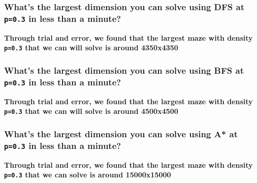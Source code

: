 \documentclass[11pt]{article}
\begin{document}
    \hypertarget{whats-the-largest-dimension-you-can-solve-using-dfs-at-p0.3-in-less-than-a-minute}{%
\subsubsection{\texorpdfstring{What's the largest dimension you can
solve using DFS at \texttt{p=0.3} in less than a
minute?}{What's the largest dimension you can solve using DFS at p=0.3 in less than a minute?}}\label{whats-the-largest-dimension-you-can-solve-using-dfs-at-p0.3-in-less-than-a-minute}}

    \textbf{Through trial and error, we found that the largest maze with
density \texttt{p=0.3} that we can will solve is around 4350x4350}

    \hypertarget{whats-the-largest-dimension-you-can-solve-using-bfs-at-p0.3-in-less-than-a-minute}{%
\subsubsection{\texorpdfstring{What's the largest dimension you can
solve using BFS at \texttt{p=0.3} in less than a
minute?}{What's the largest dimension you can solve using BFS at p=0.3 in less than a minute?}}\label{whats-the-largest-dimension-you-can-solve-using-bfs-at-p0.3-in-less-than-a-minute}}

    \textbf{Through trial and error, we found that the largest maze with
density \texttt{p=0.3} that we can will solve is around 4500x4500}

    \hypertarget{whats-the-largest-dimension-you-can-solve-using-a-at-p0.3-in-less-than-a-minute}{%
\subsubsection{\texorpdfstring{What's the largest dimension you can
solve using A* at \texttt{p=0.3} in less than a
minute?}{What's the largest dimension you can solve using A* at p=0.3 in less than a minute?}}\label{whats-the-largest-dimension-you-can-solve-using-a-at-p0.3-in-less-than-a-minute}}

    \textbf{Through trial and error, we found that the largest maze with
density \texttt{p=0.3} that we can solve is around 15000x15000}
\end{document}
